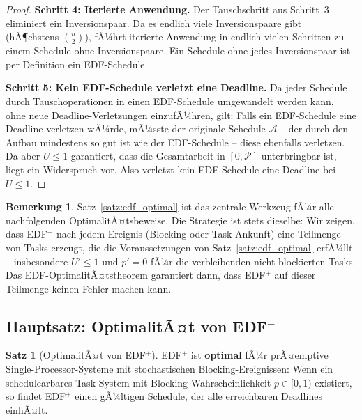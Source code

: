 ﻿\documentclass[a4paper,12pt]{article}
\theoremstyle{definition}
\newtheorem{satz}{Satz}
\newtheorem{bemerkung}{Bemerkung}
\begin{document}
\begin{proof}
		\medskip
		\textbf{Schritt 4: Iterierte Anwendung.}
		Der Tauschschritt aus Schritt~3 eliminiert ein Inversionspaar. Da es
		endlich viele Inversionspaare gibt (hÃ¶chstens $\binom{n}{2}$), fÃ¼hrt
		iterierte Anwendung in endlich vielen Schritten zu einem Schedule ohne
		Inversionspaare. Ein Schedule ohne jedes Inversionspaar ist per
		Definition ein EDF-Schedule.

		\medskip
		\textbf{Schritt 5: Kein EDF-Schedule verletzt eine Deadline.}
		Da jeder Schedule durch Tauschoperationen in einen EDF-Schedule
		umgewandelt werden kann, ohne neue Deadline-Verletzungen einzufÃ¼hren,
		gilt: Falls ein EDF-Schedule eine Deadline verletzen wÃ¼rde, mÃ¼sste
		der originale Schedule $\mathcal{A}$ -- der durch den Aufbau mindestens
		so gut ist wie der EDF-Schedule -- diese ebenfalls verletzen. Da aber
		$U \le 1$ garantiert, dass die Gesamtarbeit in $[0, \mathcal{P}]$
		unterbringbar ist, liegt ein Widerspruch vor.
		Also verletzt kein EDF-Schedule eine Deadline bei $U \le 1$.
	\end{proof}

	\begin{bemerkung}
		Satz~\ref{satz:edf_optimal} ist das zentrale Werkzeug fÃ¼r alle
		nachfolgenden OptimalitÃ¤tsbeweise. Die Strategie ist stets dieselbe:
		Wir zeigen, dass EDF$^+$ nach jedem Ereignis (Blocking oder Task-Ankunft)
		eine Teilmenge von Tasks erzeugt, die die Voraussetzungen von
		Satz~\ref{satz:edf_optimal} erfÃ¼llt -- insbesondere $U' \le 1$ und
		$p' = 0$ fÃ¼r die verbleibenden nicht-blockierten Tasks. Das
		EDF-OptimalitÃ¤tstheorem garantiert dann, dass EDF$^+$ auf dieser
		Teilmenge keinen Fehler machen kann.
	\end{bemerkung}

	\subsection{Hauptsatz: OptimalitÃ¤t von EDF$^+$}

	\begin{satz}[OptimalitÃ¤t von EDF$^+$]
		\label{satz:optimal}
		EDF$^+$ ist \textbf{optimal} fÃ¼r prÃ¤emptive Single-Processor-Systeme mit
		stochastischen Blocking-Ereignissen: Wenn ein schedulearbares Task-System mit
		Blocking-Wahrscheinlichkeit $p \in [0,1)$ existiert, so findet EDF$^+$ einen
		gÃ¼ltigen Schedule, der alle erreichbaren Deadlines einhÃ¤lt.
	\end{satz}
\end{document}
